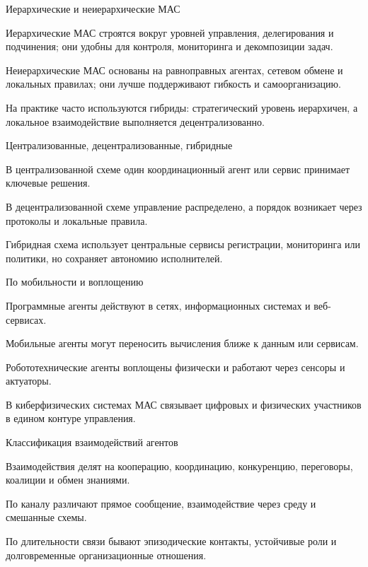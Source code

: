 \begin{frame}{Иерархические и неиерархические МАС}
	\topline
	\justifying
	\begin{textitemize}
		\item Иерархические МАС строятся вокруг уровней управления, делегирования и подчинения; они удобны для контроля, мониторинга и декомпозиции задач.
		\item Неиерархические МАС основаны на равноправных агентах, сетевом обмене и локальных правилах; они лучше поддерживают гибкость и самоорганизацию.
		\item На практике часто используются гибриды: стратегический уровень иерархичен, а локальное взаимодействие выполняется децентрализованно.
	\end{textitemize}
\end{frame}

\begin{frame}{Централизованные, децентрализованные, гибридные}
	\topline
	\justifying
	\begin{textitemize}
		\item В централизованной схеме один координационный агент или сервис принимает ключевые решения.
		\item В децентрализованной схеме управление распределено, а порядок возникает через протоколы и локальные правила.
		\item Гибридная схема использует центральные сервисы регистрации, мониторинга или политики, но сохраняет автономию исполнителей.
	\end{textitemize}
\end{frame}

\begin{frame}{По мобильности и воплощению}
	\topline
	\justifying
	\begin{textitemize}
		\item Программные агенты действуют в сетях, информационных системах и веб-сервисах.
		\item Мобильные агенты могут переносить вычисления ближе к данным или сервисам.
		\item Робототехнические агенты воплощены физически и работают через сенсоры и актуаторы.
		\item В киберфизических системах МАС связывает цифровых и физических участников в едином контуре управления.
	\end{textitemize}
\end{frame}

\begin{frame}{Классификация взаимодействий агентов}
	\topline
	\justifying
	\begin{textitemize}
		\item Взаимодействия делят на кооперацию, координацию, конкуренцию, переговоры, коалиции и обмен знаниями.
		\item По каналу различают прямое сообщение, взаимодействие через среду и смешанные схемы.
		\item По длительности связи бывают эпизодические контакты, устойчивые роли и долговременные организационные отношения.
	\end{textitemize}
\end{frame}

